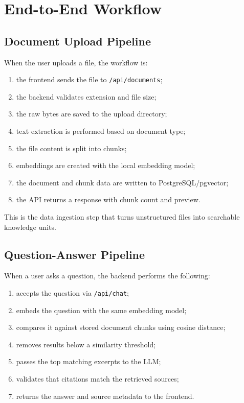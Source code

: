 \documentclass[11pt,a4paper]{article}
\begin{document}
\section{End-to-End Workflow}

\subsection{Document Upload Pipeline}
When the user uploads a file, the workflow is:

\begin{enumerate}[leftmargin=2em]
    \item the frontend sends the file to \texttt{/api/documents};
    \item the backend validates extension and file size;
    \item the raw bytes are saved to the upload directory;
    \item text extraction is performed based on document type;
    \item the file content is split into chunks;
    \item embeddings are created with the local embedding model;
    \item the document and chunk data are written to PostgreSQL/pgvector;
    \item the API returns a response with chunk count and preview.
\end{enumerate}

This is the data ingestion step that turns unstructured files into searchable knowledge units.

\subsection{Question-Answer Pipeline}
When a user asks a question, the backend performs the following:

\begin{enumerate}[leftmargin=2em]
    \item accepts the question via \texttt{/api/chat};
    \item embeds the question with the same embedding model;
    \item compares it against stored document chunks using cosine distance;
    \item removes results below a similarity threshold;
    \item passes the top matching excerpts to the LLM;
    \item validates that citations match the retrieved sources;
    \item returns the answer and source metadata to the frontend.
\end{enumerate}
\end{document}
